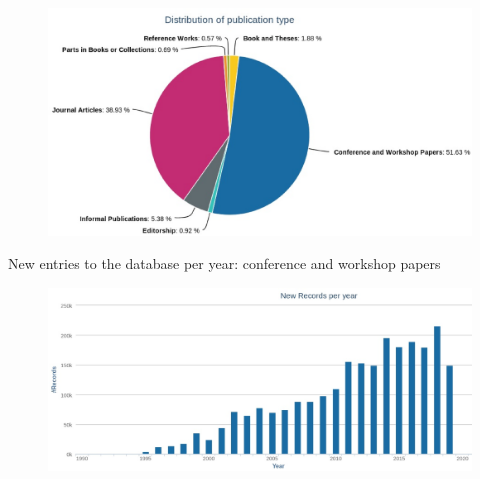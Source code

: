 \documentclass[xcolor={svgnames}]{beamer}
\makeatletter
\newcommand*{\currentname}{\@currentlabelname}
\makeatother
\begin{document}
\begin{frame}{\currentname}{}\linespread{1.5}
  \begin{figure}
    \begin{center}
      \includegraphics[width=\textwidth,height=0.6\textheight,keepaspectratio]{img/distributionofpublicationtype_2019.eps}
    \end{center}
  \end{figure}
\end{frame}

\begin{frame}{\currentname}{}\linespread{1.5}
  New entries to the database per year: conference and workshop papers
  \begin{figure}
    \begin{center}
      \includegraphics[width=\textwidth,height=0.8\textheight,keepaspectratio]{img/confrecordsperyear_2019.eps}
    \end{center}
  \end{figure}
\end{frame}
\end{document}
